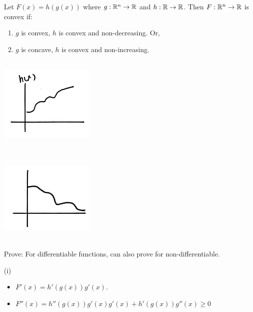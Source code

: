 Let $F(x) = h(g(x))$ where $g: \mathbb{R}^n \rightarrow \mathbb{R}$ and $h: \mathbb{R}\rightarrow \mathbb{R}$. Then $F: \mathbb{R}^n\rightarrow \mathbb{R}$ is convex if:



\begin{enumerate}
	\item $g$ is convex, $h$ is convex and non-decreasing. Or,
	
	\item $g$ is concave, $h$ is convex and non-increasing.
\end{enumerate}

\begin{marginfigure}
	\centering
	\includegraphics[width=1.8in,height=1.8in]{figures/ch08/figure1111_4.png}
\end{marginfigure}

\begin{marginfigure}
	\centering
	\includegraphics[width=1.8in,height=1.8in]{figures/ch08/figure1111_5.png}
\end{marginfigure}

Prove: For differentiable functions, can also prove for non-differentiable. 

(i)

\begin{itemize}
	\item $F'(x) = h'(g(x))g'(x)$.
	
	\item $F''(x) = h''(g(x))g'(x)g'(x) + h'(g(x))g''(x) \geq 0$ 
\end{itemize}



